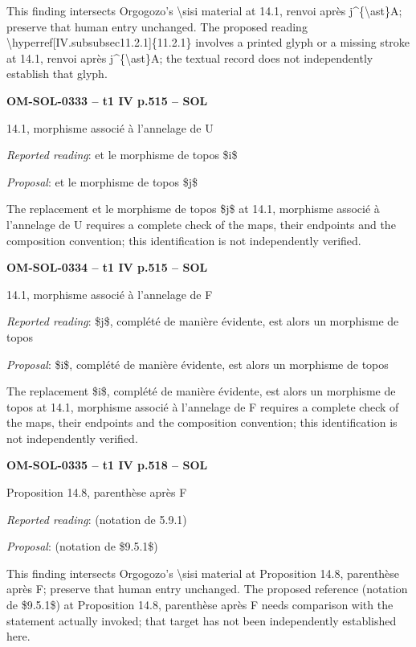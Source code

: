 This finding intersects Orgogozo's \textbackslash{}sisi material at 14.1, renvoi après j\textasciicircum{}\{\textbackslash{}ast\}A; preserve that human entry unchanged. The proposed reading \textbackslash{}hyperref[IV.subsubsec11.2.1]\{11.2.1\} involves a printed glyph or a missing stroke at 14.1, renvoi après j\textasciicircum{}\{\textbackslash{}ast\}A; the textual record does not independently establish that glyph.\par
\par\noindent\textbf{OM-SOL-0333 -- t1 IV p.515 -- SOL}\par
14.1, morphisme associé à l'annelage de U\par
\emph{Reported reading}: et le morphisme de topos \$i\$\par
\emph{Proposal}: et le morphisme de topos \$j\$\par
The replacement et le morphisme de topos \$j\$ at 14.1, morphisme associé à l'annelage de U requires a complete check of the maps, their endpoints and the composition convention; this identification is not independently verified.\par
\par\noindent\textbf{OM-SOL-0334 -- t1 IV p.515 -- SOL}\par
14.1, morphisme associé à l'annelage de F\par
\emph{Reported reading}: \$j\$, complété de manière évidente, est alors un morphisme de topos\par
\emph{Proposal}: \$i\$, complété de manière évidente, est alors un morphisme de topos\par
The replacement \$i\$, complété de manière évidente, est alors un morphisme de topos at 14.1, morphisme associé à l'annelage de F requires a complete check of the maps, their endpoints and the composition convention; this identification is not independently verified.\par
\par\noindent\textbf{OM-SOL-0335 -- t1 IV p.518 -- SOL}\par
Proposition 14.8, parenthèse après F\par
\emph{Reported reading}: (notation de 5.9.1)\par
\emph{Proposal}: (notation de \$9.5.1\$)\par
This finding intersects Orgogozo's \textbackslash{}sisi material at Proposition 14.8, parenthèse après F; preserve that human entry unchanged. The proposed reference (notation de \$9.5.1\$) at Proposition 14.8, parenthèse après F needs comparison with the statement actually invoked; that target has not been independently established here.\par
